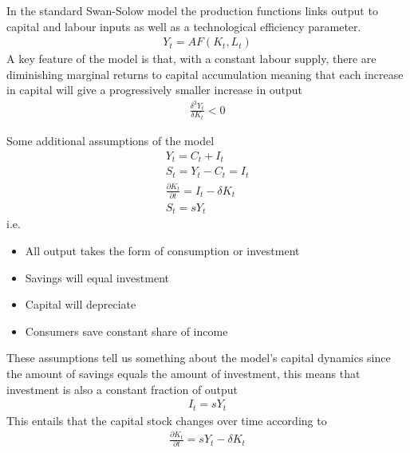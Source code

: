 \documentclass{beamer}
\begin{document}
\begin{frame}
In the standard Swan-Solow model the production functions links output to capital and labour inputs as well as a technological efficiency parameter.
\begin{align}
  Y_t = AF(K_t,L_t) 
\end{align}
\medskip
A key feature of the model is that, with a constant labour supply, there are diminishing marginal returns to capital accumulation meaning that each increase in capital will give a progressively smaller increase in output
\begin{align}
  \frac{\delta^2Y_t}{\delta K_t}<0
\end{align}
\end{frame}

\begin{frame}
 Some additional assumptions of the model  
  \begin{align}
    Y_t =C_t+I_t\\ 
    S_t=Y_t-C_t=I_t \\ 
    \frac{\partial K_t}{\partial t}=I_t -\delta K_t \\
    S_t=sY_t
  \end{align}
  \medskip
  i.e. 
  \begin{itemize}
    \item All output takes the form of consumption or investment 
    \item Savings will equal investment
    \item Capital will depreciate
    \item Consumers save constant share of income
  \end{itemize}
\end{frame}

\begin{frame}
  These assumptions tell us something about the model's capital dynamics since the amount of savings equals the amount of investment, this means that investment is also a constant fraction of output
  \begin{align}
    I_t=sY_t
  \end{align}
  This entails that the capital stock changes over time according to
  \begin{align}
    \frac{\partial K_t}{\partial t}=sY_t-\delta K_t
  \end{align}
\end{frame}
\end{document}
